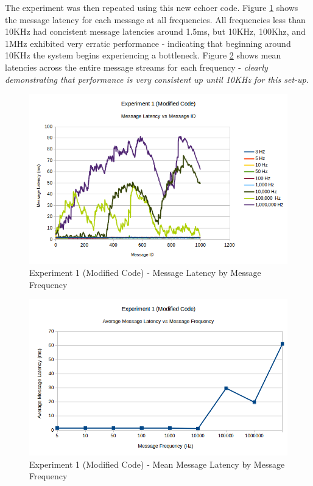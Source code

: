 \documentclass[../dissertation.tex]{subfiles}
\begin{document}
The experiment was then repeated using this new echoer code\cite{Experiment1NoEchoDelayCode}. Figure \ref{exp1-modified-all-freqs} shows the message latency for each message at all frequencies. All frequencies less than 10KHz had concistent message latencies around 1.5ms, but 10KHz, 100Khz, and 1MHz exhibited very erratic performance - indicating that beginning around 10KHz the system begins experiencing a bottleneck. Figure \ref{exp1-modified-mean-latency-all-freqs} shows mean latencies across the entire message streams for each frequency - \textit{clearly demonstrating that performance is very consistent up until 10KHz for this set-up}.

\begin{figure}[H]
\centering
\includegraphics[width=\textwidth]{images/experiment1/modified_msgid_msglatency_all_freqs.png}
\caption{Experiment 1 (Modified Code) - Message Latency by Message Frequency}
\label{exp1-modified-all-freqs}
\end{figure}

\begin{figure}[H]
\centering
\includegraphics[width=\textwidth]{images/experiment1/modified_average_msglatency_all_freqs.png}
\caption{Experiment 1 (Modified Code) - Mean Message Latency by Message Frequency}
\label{exp1-modified-mean-latency-all-freqs}
\end{figure}
\end{document}
